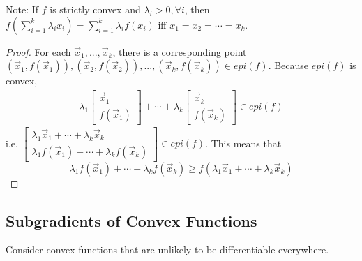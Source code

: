 \documentclass[11pt,a4paper]{article}
\begin{document}
Note: If $f$ is strictly convex and $\lambda_i>0,\forall i$, then $f(\sum_{i=1}^k\lambda_i x_i)= \sum_{i=1}^k\lambda_if(x_i)$ iff $x_1=x_2=\cdots=x_k$.
\begin{proof}
    For each $\vec{x}_1,...,\vec{x}_k$, there is a corresponding point $(\vec{x}_1,f(\vec{x}_1)),(\vec{x}_2,f(\vec{x}_2)),...,(\vec{x}_k,f(\vec{x}_k))\in {epi}(f)$. Because ${epi}(f)$ is convex,
    \begin{equation}
        \begin{aligned}
            \lambda_1 \begin{bmatrix}
                \vec{x}_1\\
                f(\vec{x}_1)
            \end{bmatrix}+\cdots+\lambda_k \begin{bmatrix}
                \vec{x}_k\\
                f(\vec{x}_k)
            \end{bmatrix}\in {epi}(f)
        \end{aligned}
        \nonumber
    \end{equation}
    i.e. $\begin{bmatrix}
        \lambda_1\vec{x}_1+\cdots+\lambda_k\vec{x}_k\\
        \lambda_1f(\vec{x}_1)+\cdots+\lambda_kf(\vec{x}_k)
    \end{bmatrix}\in{epi}(f)$. This means that $$\lambda_1f(\vec{x}_1)+\cdots+\lambda_k f(\vec{x}_k)\geq f(\lambda_1\vec{x}_1+\cdots+\lambda_k\vec{x}_k)$$
\end{proof}

\subsection{ Subgradients of Convex Functions}
Consider convex functions that are unlikely to be differentiable everywhere.
\end{document}

